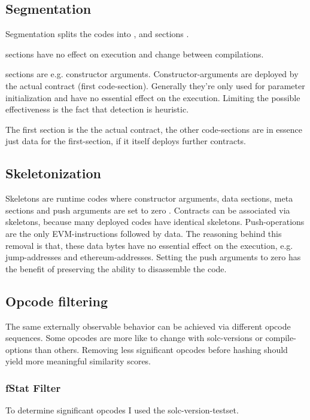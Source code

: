 \documentclass[../main.tex]{subfiles}
\begin{document}
\subsection{Segmentation}
Segmentation splits the codes into ,  and  sections \cite{ethutils}.

 sections have no effect on execution and change between compilations.

 sections are e.g. constructor arguments.
Constructor-arguments are deployed by the actual contract (first code-section).
Generally they're only used for parameter initialization and have no essential effect on the execution.
Limiting the possible effectiveness is the fact that detection is heuristic.

The first  section is the the actual contract, the other code-sections are in essence just data for the first-section, if it itself deploys further contracts.

\subsection{Skeletonization}
Skeletons are runtime codes where constructor arguments, data sections, meta sections and push arguments are set to zero \cite{ethutils}.
Contracts can be associated via skeletons, because many deployed codes have identical skeletons.
Push-operations are the only EVM-instructions followed by data.
The reasoning behind this removal is that, these data bytes have no essential effect on the execution, e.g. jump-addresses and ethereum-addresses.
Setting the push arguments to zero has the benefit of preserving the ability to disassemble the code.

\subsection{Opcode filtering}
The same externally observable behavior can be achieved via different opcode sequences.
Some opcodes are more like to change with solc-versions or compile-options than others.
Removing less significant opcodes before hashing should yield more meaningful similarity scores.

\subsubsection{fStat Filter\cite{ethereum-contract-similarity}}
To determine significant opcodes I used the solc-version-testset\cite{solc-versions-testset}.
\end{document}
